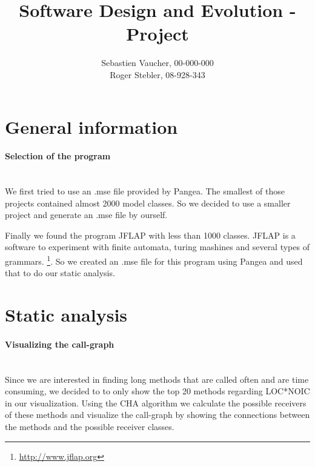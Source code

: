\documentclass{paper}
\title{Software Design and Evolution - Project}
\author{Sebastien Vaucher, 00-000-000\\Roger Stebler, 08-928-343}
\begin{document}
\maketitle


%

\section{General information}

\paragraph{Selection of the program}\mbox{}\vspace{10pt}\\
We first tried to use an .mse file provided by Pangea. The smallest of those projects contained almost 2000 model classes. So we decided to use a smaller project and generate an .mse file by ourself.


Finally we found the program JFLAP with less than 1000 classes. JFLAP is a software to experiment with finite automata, turing mashines and several types of grammars. \footnote{\url{http://www.jflap.org}}. So we created an .mse file for this program using Pangea and used that to do our static analysis.


\section{Static analysis}

\paragraph{Visualizing the call-graph}\mbox{}\vspace{10pt}\\
Since we are interested in finding long methods that are called often and are time consuming, we decided to to only show the top 20 methods regarding LOC*NOIC in our visualization. Using the CHA algorithm we calculate the possible receivers of these methods and visualize the call-graph by showing the connections between the methods and the possible receiver classes.
\end{document}
